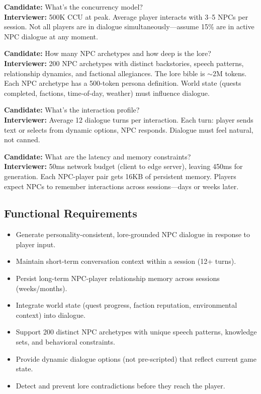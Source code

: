 \textbf{Candidate:} What's the concurrency model?\\
\textbf{Interviewer:} 500K CCU at peak. Average player interacts with 3--5 NPCs per session. Not all players are in dialogue simultaneously---assume 15\% are in active NPC dialogue at any moment.

\textbf{Candidate:} How many NPC archetypes and how deep is the lore?\\
\textbf{Interviewer:} 200 NPC archetypes with distinct backstories, speech patterns, relationship dynamics, and factional allegiances. The lore bible is $\sim$2M tokens. Each NPC archetype has a 500-token persona definition. World state (quests completed, factions, time-of-day, weather) must influence dialogue.

\textbf{Candidate:} What's the interaction profile?\\
\textbf{Interviewer:} Average 12 dialogue turns per interaction. Each turn: player sends text or selects from dynamic options, NPC responds. Dialogue must feel natural, not canned.

\textbf{Candidate:} What are the latency and memory constraints?\\
\textbf{Interviewer:} 50ms network budget (client to edge server), leaving 450ms for generation. Each NPC-player pair gets 16KB of persistent memory. Players expect NPCs to remember interactions across sessions---days or weeks later.

\subsection*{Functional Requirements}
\begin{itemize}
  \item Generate personality-consistent, lore-grounded NPC dialogue in response to player input.
  \item Maintain short-term conversation context within a session (12+ turns).
  \item Persist long-term NPC-player relationship memory across sessions (weeks/months).
  \item Integrate world state (quest progress, faction reputation, environmental context) into dialogue.
  \item Support 200 distinct NPC archetypes with unique speech patterns, knowledge sets, and behavioral constraints.
  \item Provide dynamic dialogue options (not pre-scripted) that reflect current game state.
  \item Detect and prevent lore contradictions before they reach the player.
\end{itemize}

